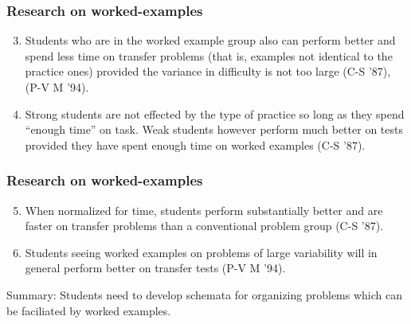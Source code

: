 \documentclass{beamer}
\begin{document}
\frame
{
  \frametitle{Research on worked-examples}

            \begin{enumerate}
            \setcounter{enumi}{2}
            \item Students who are in the worked example group also can perform better and spend less time on transfer problems (that is, examples not identical to the practice ones) provided the variance in difficulty is not too large (C-S '87), (P-V M '94).
            \item Strong students are not effected by the type of practice so long as they spend ``enough time'' on task. Weak students however perform much better on tests provided they have spent enough time on worked examples  (C-S '87).
            \end{enumerate}
}

\frame
{
  \frametitle{Research on worked-examples}

            \begin{enumerate}
            \setcounter{enumi}{4}
            \item When normalized for time, students perform substantially better and are faster on transfer problems than a conventional problem group (C-S '87).
            \item Students seeing worked examples on problems of large variability will in general perform better on transfer tests (P-V M '94). \pause
            \end{enumerate}

          \alert{Summary: Students need to develop schemata for organizing problems which can be faciliated by worked examples.}
}
\end{document}
